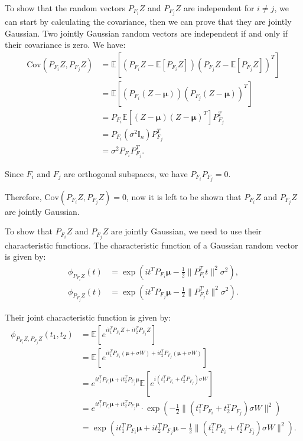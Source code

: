 \documentclass[a4paper, 12pt]{article}
\begin{document}
\begin{answerenum}
        \item To show that the random vectors $P_{F_i}Z$ and $P_{F_j}Z$ are independent for $i \neq j$, we can start by calculating the covariance, then we can prove that they are jointly Gaussian. Two jointly Gaussian random vectors are independent if and only if their covariance is zero. We have:
            \begin{align*}
                \text{Cov}(P_{F_i}Z, P_{F_j}Z) &= \mathbb{E}[(P_{F_i}Z - \mathbb{E}[P_{F_i}Z])(P_{F_j}Z - \mathbb{E}[P_{F_j}Z])^T] \\
                &= \mathbb{E}[(P_{F_i}(Z - \boldsymbol{\mu}))(P_{F_j}(Z - \boldsymbol{\mu}))^T] \\
                &= P_{F_i}\mathbb{E}[(Z - \boldsymbol{\mu})(Z - \boldsymbol{\mu})^T]P_{F_j}^T \\
                &= P_{F_i}(\sigma^2\mathbb{I}_n)P_{F_j}^T \\
                &= \sigma^2 P_{F_i}P_{F_j}^T.
            \end{align*}

            Since $F_i$ and $F_j$ are orthogonal subspaces, we have $P_{F_i}P_{F_j} = 0$.

            Therefore, $\text{Cov}(P_{F_i}Z, P_{F_j}Z) = 0$, now it is left to be shown that $P_{F_i}Z$ and $P_{F_j}Z$ are jointly Gaussian.

            To show that $P_{F_i}Z$ and $P_{F_j}Z$ are jointly Gaussian, we need to use their characteristic functions. The characteristic function of a Gaussian random vector is given by:
            \begin{align*}
                \phi_{P_{F_i}Z}(t) &= \exp\left( i t^T P_{F_i}\boldsymbol{\mu} - \frac{1}{2} \|P_{F_i}^T t\|^2 \sigma^2 \right), \\
                \phi_{P_{F_j}Z}(t) &= \exp\left( i t^T P_{F_j}\boldsymbol{\mu} - \frac{1}{2} \|P_{F_j}^T t\|^2 \sigma^2 \right).
            \end{align*}

            Their joint characteristic function is given by:
            \begin{align*}
                \phi_{P_{F_i}Z, P_{F_j}Z}(t_1, t_2) &= \mathbb{E}\left[ e^{i t_1^T P_{F_i}Z + i t_2^T P_{F_j}Z} \right] \\
                &= \mathbb{E}\left[ e^{i t_1^T P_{F_i}(\boldsymbol{\mu} + \sigma W) + i t_2^T P_{F_j}(\boldsymbol{\mu} + \sigma W)} \right] \\
                &= e^{i t_1^T P_{F_i}\boldsymbol{\mu} + i t_2^T P_{F_j}\boldsymbol{\mu}} \mathbb{E}\left[ e^{i (t_1^T P_{F_i} + t_2^T P_{F_j}) \sigma W} \right] \\
                &= e^{i t_1^T P_{F_i}\boldsymbol{\mu} + i t_2^T P_{F_j}\boldsymbol{\mu}} \cdot \exp\left( -\frac{1}{2} \| (t_1^T P_{F_i} + t_2^T P_{F_j}) \sigma W \|^2 \right) \\
                &= \exp\left( i t_1^T P_{F_i}\boldsymbol{\mu} + i t_2^T P_{F_j}\boldsymbol{\mu} - \frac{1}{2} \| (t_1^T P_{F_i} + t_2^T P_{F_j}) \sigma W \|^2 \right).
            \end{align*}


\end{answerenum}
\end{document}
